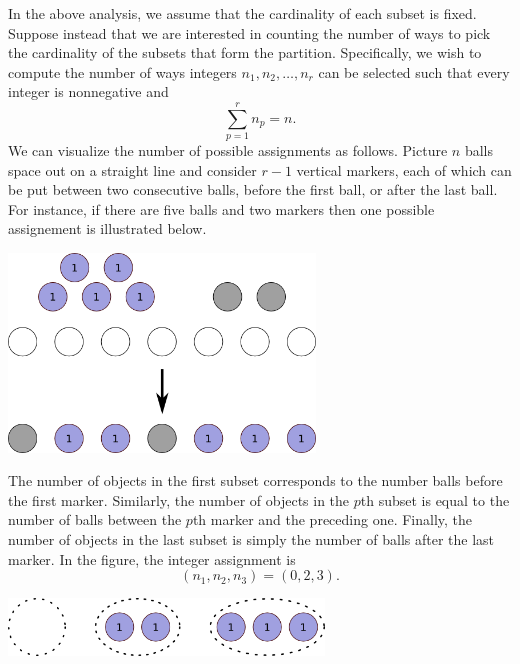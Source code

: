 In the above analysis, we assume that the cardinality of each subset is fixed.
Suppose instead that we are interested in counting the number of ways to pick the cardinality of the subsets that form the partition.
Specifically, we wish to compute the number of ways integers $n_1, n_2, \ldots, n_r$ can be selected such that every integer is nonnegative and
\begin{equation*}
\sum_{p = 1}^r n_p = n.
\end{equation*}
We can visualize the number of possible assignments as follows.
Picture $n$ balls space out on a straight line and consider $r-1$ vertical markers, each of which can be put between two consecutive balls, before the first ball, or after the last ball. 
For instance, if there are five balls and two markers then one possible assignement is illustrated below.

\begin{center}
\includegraphics[height=5.28cm]{Figures/4Chapter/partitioning}
\end{center}

The number of objects in the first subset corresponds to the number balls before the first marker.
Similarly, the number of objects in the $p$th subset is equal to the number of balls between the $p$th marker and the preceding one.
Finally, the number of objects in the last subset is simply the number of balls after the last marker.
In the figure, the integer assignment is
\begin{equation*}
(n_1, n_2, n_3) = (0,2,3).
\end{equation*}

\begin{center}
\includegraphics[height=1.53cm]{Figures/4Chapter/partitioning2}
\end{center}

